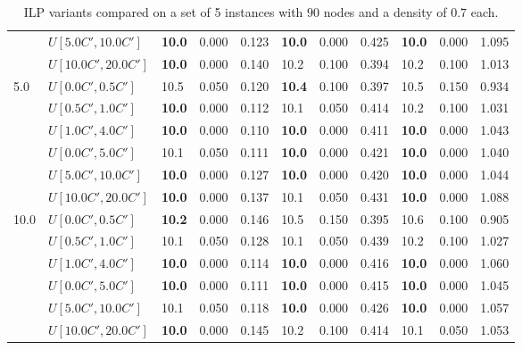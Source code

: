 \begin{table}[h]
{\begin{tabular}{|l|l||l|l|l||l|l|l||l|l|l|}
       & $U[5.0C',10.0C']$ & \textbf{10.0} & 0.000 & 0.123 & \textbf{10.0} & 0.000 & 0.425 & \textbf{10.0} & 0.000 & 1.095 \\
       & $U[10.0C',20.0C']$ & \textbf{10.0} & 0.000 & 0.140 & 10.2 & 0.100 & 0.394 & 10.2 & 0.100 & 1.013 \\
      \hline\hline
      \multirow{6}{*}{5.0} & $U[0.0C',0.5C']$ & 10.5 & 0.050 & 0.120 & \textbf{10.4} & 0.100 & 0.397 & 10.5 & 0.150 & 0.934 \\
       & $U[0.5C',1.0C']$ & \textbf{10.0} & 0.000 & 0.112 & 10.1 & 0.050 & 0.414 & 10.2 & 0.100 & 1.031 \\
       & $U[1.0C',4.0C']$ & \textbf{10.0} & 0.000 & 0.110 & \textbf{10.0} & 0.000 & 0.411 & \textbf{10.0} & 0.000 & 1.043 \\
       & $U[0.0C',5.0C']$ & 10.1 & 0.050 & 0.111 & \textbf{10.0} & 0.000 & 0.421 & \textbf{10.0} & 0.000 & 1.040 \\
       & $U[5.0C',10.0C']$ & \textbf{10.0} & 0.000 & 0.127 & \textbf{10.0} & 0.000 & 0.420 & \textbf{10.0} & 0.000 & 1.044 \\
       & $U[10.0C',20.0C']$ & \textbf{10.0} & 0.000 & 0.137 & 10.1 & 0.050 & 0.431 & \textbf{10.0} & 0.000 & 1.088 \\
      \hline\hline
      \multirow{6}{*}{10.0} & $U[0.0C',0.5C']$ & \textbf{10.2} & 0.000 & 0.146 & 10.5 & 0.150 & 0.395 & 10.6 & 0.100 & 0.905 \\
       & $U[0.5C',1.0C']$ & 10.1 & 0.050 & 0.128 & 10.1 & 0.050 & 0.439 & 10.2 & 0.100 & 1.027 \\
       & $U[1.0C',4.0C']$ & \textbf{10.0} & 0.000 & 0.114 & \textbf{10.0} & 0.000 & 0.416 & \textbf{10.0} & 0.000 & 1.060 \\
       & $U[0.0C',5.0C']$ & \textbf{10.0} & 0.000 & 0.111 & \textbf{10.0} & 0.000 & 0.415 & \textbf{10.0} & 0.000 & 1.045 \\
       & $U[5.0C',10.0C']$ & 10.1 & 0.050 & 0.118 & \textbf{10.0} & 0.000 & 0.426 & \textbf{10.0} & 0.000 & 1.057 \\
       & $U[10.0C',20.0C']$ & \textbf{10.0} & 0.000 & 0.145 & 10.2 & 0.100 & 0.414 & 10.1 & 0.050 & 1.053 \\
      \hline
      \end{tabular}
      }
      \caption{ILP variants compared on a set of 5 instances with $90$ nodes and a density of $0.7$ each.}
      \label{tab:pcpn90p7RecoloredTT}
      \end{table}

